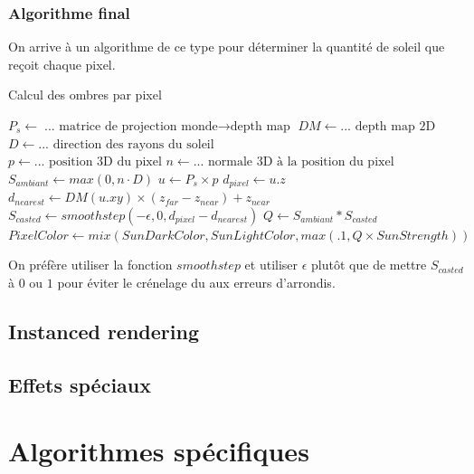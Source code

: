 \documentclass[11pt]{article} %
\begin{document}
\subsubsection{Algorithme final}

On arrive à un algorithme de ce type pour déterminer la quantité de soleil que reçoit chaque pixel.
\begin{algorithm}
\caption{Calcul des ombres par pixel}\label{alg:cap}
\begin{algorithmic}
\State $P_s \gets \text{... matrice de projection monde$\rightarrow$depth map}$
\State $DM \gets \text{... depth map 2D}$
\State $D \gets \text{... direction des rayons du soleil}$
\\
\State $p \gets \text{...  position 3D du pixel}$
\State $n \gets \text{... normale 3D à la position du pixel}$
\\
\State $S_{ambiant} \gets max(0, n\cdot D)$
\State $u \gets P_s\times p$
\State $d_{pixel} \gets u.z$
\State $d_{nearest} \gets DM(u.xy)\times(z_{far}-z_{near})+z_{near}$
\State $S_{casted} \gets smoothstep(-\epsilon, 0, d_{pixel}-d_{nearest})$
\State $Q \gets S_{ambiant}*S_{casted}$
\\
\State $PixelColor\gets mix(SunDarkColor, SunLightColor, max(.1, Q\times SunStrength))$
\end{algorithmic}
\end{algorithm}

On préfère utiliser la fonction $smoothstep$ et utiliser $\epsilon$ plutôt que de mettre $S_{casted}$ à $0$ ou $1$ pour éviter le crénelage du aux erreurs d'arrondis.


\subsection{Instanced rendering}

\subsection{Effets spéciaux}

\subsubsection{} %




\section{Algorithmes spécifiques}
\end{document}
